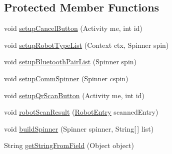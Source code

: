 \subsection*{Protected Member Functions}
\begin{DoxyCompactItemize}
\item 
void \hyperlink{classcom_1_1cellbots_1_1_robot_base_create_a100b56d8ac81baa2e4b2acc8e79423e8}{setup\-Cancel\-Button} (Activity me, int id)
\item 
void \hyperlink{classcom_1_1cellbots_1_1_robot_base_create_a13f290d1e7ed4948d0d14da774ae076b}{setup\-Robot\-Type\-List} (Context ctx, Spinner spin)
\item 
void \hyperlink{classcom_1_1cellbots_1_1_robot_base_create_ac29708c753a43459596917a09e17edcc}{setup\-Bluetooth\-Pair\-List} (Spinner spin)
\item 
void \hyperlink{classcom_1_1cellbots_1_1_robot_base_create_a994fea32b4961e33532f367931d945e5}{setup\-Comm\-Spinner} (Spinner cspin)
\item 
void \hyperlink{classcom_1_1cellbots_1_1_robot_base_create_a798b325690b9c5cf7f125cb4ce4acd86}{setup\-Qr\-Scan\-Button} (Activity me, int id)
\item 
void \hyperlink{classcom_1_1cellbots_1_1_robot_base_create_a517846f7c3a7df6adeadbd5db50ce7cd}{robot\-Scan\-Result} (\hyperlink{classcom_1_1cellbots_1_1_robot_entry}{Robot\-Entry} scanned\-Entry)
\item 
void \hyperlink{classcom_1_1cellbots_1_1_robot_base_create_a56132e830bbc0b23f39d11a47ce80fa1}{build\-Spinner} (Spinner spinner, String\mbox{[}$\,$\mbox{]} list)
\item 
String \hyperlink{classcom_1_1cellbots_1_1_robot_base_create_ad3b9118fbd142b172ac65431e9a60d0d}{get\-String\-From\-Field} (Object object)
\end{DoxyCompactItemize}
